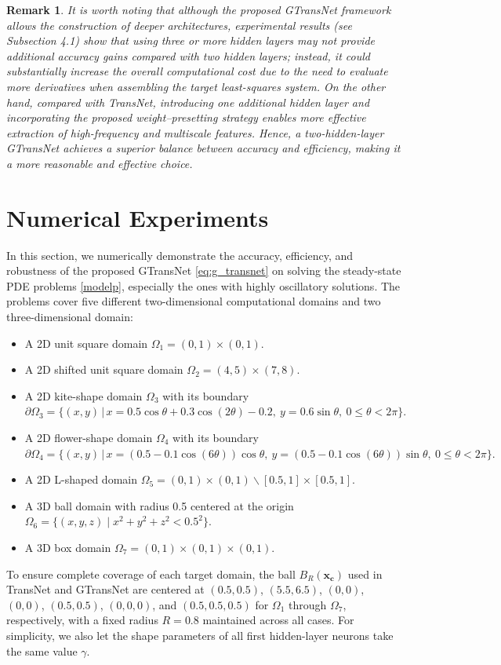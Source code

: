 \documentclass{article}
\newtheorem{remark}{Remark}
\begin{document}
\begin{remark}
It is worth noting that although the proposed GTransNet framework allows the construction of deeper architectures, experimental results (see Subsection 4.1) show that using three or more hidden layers may not provide additional accuracy gains compared with two hidden layers; instead, it could substantially increase the overall computational cost due to the need to evaluate more derivatives when assembling the target least-squares system. On the other hand, compared with TransNet, introducing one additional hidden layer and incorporating the proposed weight–presetting strategy enables more effective extraction of  high-frequency and multiscale features. Hence, a two-hidden-layer GTransNet achieves a superior balance between accuracy and efficiency, making it a more reasonable and effective choice.
\end{remark}

\section{Numerical Experiments}\label{sec:4}
In this section, we numerically demonstrate the accuracy, efficiency, and robustness of the proposed GTransNet \eqref{eq:g_transnet} on solving the steady-state PDE problems \eqref{modelp}, especially the ones with highly oscillatory solutions. The problems cover five different two-dimensional computational domains and two three-dimensional domain:
\begin{itemize}
\item A 2D unit square domain $\Omega_1 = (0,1)\times (0,1)$.
\item A 2D shifted unit square domain $\Omega_2 = (4,5)\times (7,8)$.
\item A 2D kite-shape domain $\Omega_3$ with  its boundary
$\partial\Omega_3
= \{(x,y)\,|\, x = 0.5\cos \theta + 0.3\cos(2\theta) - 0.2, ~y = 0.6\sin \theta,~ 0\leq\theta<2\pi\}.$
\item A 2D flower-shape domain $\Omega_4$ with its boundary 
$\partial\Omega_4
= \{(x,y)\,|\, x = (0.5 - 0.1\cos(6\theta))\cos \theta, ~y = (0.5 - 0.1\cos(6\theta))\sin \theta,~ 0\leq\theta<2\pi\}.$
\item A 2D L-shaped domain $\Omega_5 = (0,1)\times (0,1) \backslash [0.5,1] \times [0.5,1].$
\item A 3D ball domain with radius 0.5 centered at the origin 
$\Omega_6 = \{(x,y,z)\mid x^2 + y^2 + z^2 < 0.5^2\}.$ 
\item A 3D box domain $\Omega_7=(0,1)\times (0,1)\times (0,1)$.
\end{itemize}
To ensure complete coverage of each target domain, the ball $B_R(\mathbf{x_c})$ used in TransNet and GTransNet are centered at $(0.5,0.5)$, $(5.5,6.5)$, $(0,0)$, $(0,0)$, $(0.5,0.5)$, $(0,0,0)$, and $(0.5,0.5,0.5)$ for $\Omega_1$ through $\Omega_7$, respectively, with a fixed radius $R=0.8$ maintained across all cases.
For simplicity, we also let the shape parameters of all first hidden-layer neurons take the same value $\gamma$.
\end{document}
